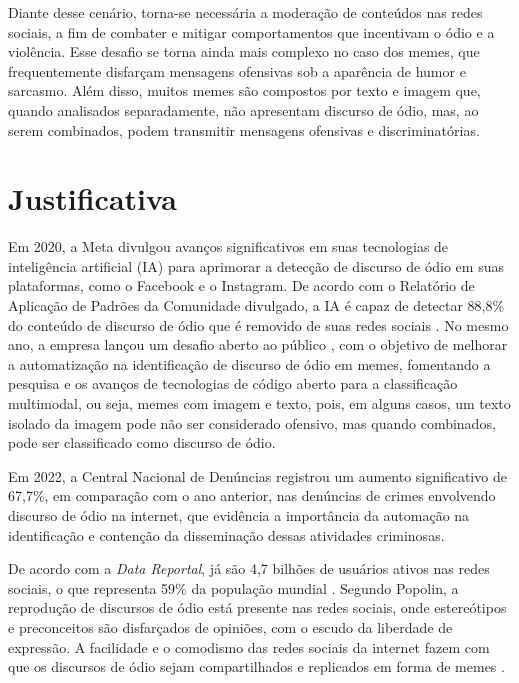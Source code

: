 Diante desse cenário, torna-se necessária a moderação de conteúdos nas redes sociais, a fim de combater e mitigar comportamentos que incentivam o ódio e a violência. Esse desafio se torna ainda mais complexo no caso dos memes, que frequentemente disfarçam mensagens ofensivas sob a aparência de humor e sarcasmo. Além disso, muitos memes são compostos por texto e imagem que, quando analisados separadamente, não apresentam discurso de ódio, mas, ao serem combinados, podem transmitir mensagens ofensivas e discriminatórias.

\section{Justificativa}

Em 2020, a Meta divulgou avanços significativos em suas tecnologias de inteligência artificial (IA) para aprimorar a detecção de discurso de ódio em suas plataformas, como o Facebook e o Instagram. De acordo com o Relatório de Aplicação de Padrões da Comunidade divulgado, a IA é capaz de detectar 88,8\% do conteúdo de discurso de ódio que é removido de suas redes sociais \cite{MetaAIAdvances2020}. No mesmo ano, a empresa lançou um desafio aberto ao público \cite{hatefulmemes2020}, com o objetivo de melhorar a automatização na identificação de discurso de ódio em memes, fomentando a pesquisa e os avanços de tecnologias de código aberto para a classificação multimodal, ou seja, memes com imagem e texto, pois, em alguns casos, um texto isolado da imagem pode não ser considerado ofensivo, mas quando combinados, pode ser classificado como discurso de ódio.

Em 2022, a Central Nacional de Denúncias \cite{Safernet2022} registrou um aumento significativo de 67,7\%, em comparação com o ano anterior, nas denúncias de crimes envolvendo discurso de ódio na internet, que evidência a importância da automação na identificação e contenção da disseminação dessas atividades criminosas.

De acordo com a \textit{Data Reportal}, já são 4,7 bilhões de usuários ativos nas redes sociais, o que representa 59\% da população mundial \cite{DataReportal2022}. Segundo Popolin, a reprodução de discursos de ódio está presente nas redes sociais, onde estereótipos e preconceitos são disfarçados de opiniões, com o escudo da liberdade de expressão. A facilidade e o comodismo das redes sociais da internet fazem com que os discursos de ódio sejam compartilhados e replicados em forma de memes \cite{POPOLIN2018}.

